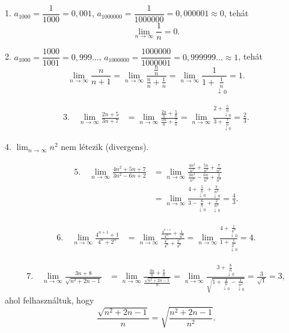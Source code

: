 \documentclass[11pt]{article}
\begin{document}
\begin{solution}
1. $a_{1000}=\dfrac{1}{1000}=0,001$, $a_{1000000}=\dfrac{1}{1000000}=0,000001\approx 0$, tehát
\[
\lim_{n\to\infty}\frac{1}{n}=0 .
\]

2. $a_{1000}=\dfrac{1000}{1001}=0,999\ldots$, $a_{1000000}=\dfrac{1000000}{1000001}=0,999999\ldots\approx 1$, tehát
\[
\lim_{n\to\infty}\frac{n}{n+1}
=\lim_{n\to\infty}\frac{\frac{n}{n}}{\frac{n}{n}+\frac{1}{n}}
=\lim_{n\to\infty}\frac{1}{1+\underset{\downarrow\,0}{\frac{1}{n}}}=1 .
\]

\begin{align*}
3.\quad \lim_{n\to\infty}\frac{2n+5}{3n+7}
&=\lim_{n\to\infty}\frac{\frac{2n}{n}+\frac{5}{n}}{\frac{3n}{n}+\frac{7}{n}}
=\lim_{n\to\infty}\frac{2+\underset{\downarrow\,0}{\frac{5}{n}}}
{3+\underset{\downarrow\,0}{\frac{7}{n}}}=\frac{2}{3}.
\end{align*}

4. $\displaystyle\lim_{n\to\infty}n^{2}$ nem létezik (divergens).

\begin{align*}
5.\quad \lim_{n\to\infty}\frac{4n^{2}+5n+7}{3n^{2}-6n+2}
&=\lim_{n\to\infty}\frac{\frac{4n^{2}}{n^{2}}+\frac{5n}{n^{2}}+\frac{7}{n^{2}}}
{\frac{3n^{2}}{n^{2}}-\frac{6n}{n^{2}}+\frac{2}{n^{2}}}\\[0.4em]
&=\lim_{n\to\infty}\frac{4+\underset{\downarrow\,0}{\frac{5}{n}}+\underset{\downarrow\,0}{\frac{7}{n^{2}}}}
{3-\underset{\downarrow\,0}{\frac{6}{n}}+\underset{\downarrow\,0}{\frac{2}{n^{2}}}}=\frac{4}{3}.
\end{align*}

\begin{align*}
6.\quad \lim_{n\to\infty}\frac{4^{n+1}+1}{4^{n}+2^{n}}
&=\lim_{n\to\infty}\frac{\frac{4^{n+1}}{4^{n}}+\frac{1}{4^{n}}}
{\frac{4^{n}}{4^{n}}+\frac{2^{n}}{4^{n}}}
=\lim_{n\to\infty}\frac{4+\underset{\downarrow\,0}{\frac{1}{4^{n}}}}
{1+\underset{\downarrow\,0}{\frac{1}{2^{n}}}}=4 .
\end{align*}

\begin{align*}
7.\quad \lim_{n\to\infty}\frac{3n+8}{\sqrt{n^{2}+2n-1}}
&=\lim_{n\to\infty}\frac{\frac{3n}{n}+\frac{8}{n}}{\frac{\sqrt{n^{2}+2n-1}}{n}}
=\lim_{n\to\infty}\frac{3+\underset{\downarrow\,0}{\frac{8}{n}}}
{\sqrt{1+\underset{\downarrow\,0}{\frac{2}{n}}-\underset{\downarrow\,0}{\frac{1}{n^{2}}}}}
=\frac{3}{\sqrt{1}}=3,
\end{align*}
ahol felhasználtuk, hogy
\[
\frac{\sqrt{n^{2}+2n-1}}{n}=\sqrt{\frac{n^{2}+2n-1}{n^{2}}}.
\]
\end{solution}
\end{document}
